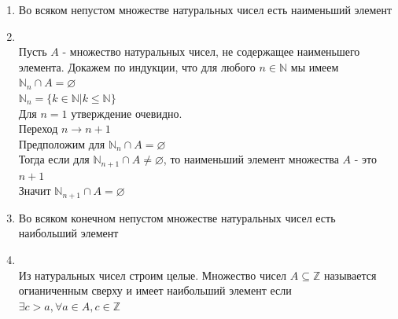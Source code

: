 \documentclass[12pt,letterpaper]{report}
\makeatletter
\theoremstyle{definition}
\newcommand{\Z}{\mathbb{Z}}
\newcommand{\N}{\mathbb{N}}
\renewenvironment{proof}[1][\proofname]{%
   \par\pushQED{\qed}\normalfont%
   \topsep6\p@\@plus6\p@\relax
   \trivlist\item[\hskip\labelsep\bfseries#1\@addpunct{.}]%
   \ignorespaces
}{%
   \popQED\endtrivlist\@endpefalse
}
\makeatother
\begin{document}
\begin{enumerate}
    \item Во всяком непустом множестве натуральных чисел есть наименьший элемент  
    \begin{proof}
        \quad \\
        Пусть $A$ - множество натуральных чисел, не содержащее наименьшего элемента.
        Докажем по индукции, что для любого $n \in \mathbb{N}$ мы имеем $\mathbb{N}_n \cap A = \varnothing$ \\
        $\N_n = \{k \in \N | k \leqslant \N \}$ \\
        Для $n = 1$ утверждение очевидно. \\
        Переход $n \longrightarrow n+1$ \\
        Предположим для $\mathbb{N}_n \cap A = \varnothing$ \\
        Тогда если для $\mathbb{N}_{n+1} \cap A \neq \varnothing$, то наименьший элемент множества $A$ - это $n+1$ \\
        Значит $\mathbb{N}_{n+1} \cap A = \varnothing$
   \end{proof}
   \item Во всяком конечном непустом множестве натуральных чисел есть наибольший элемент
   \begin{proof}
        \quad \\
        Из натуральных чисел строим целые. Множество чисел $A \subseteq \Z$ называется огианиченным сверху и имеет наибольший элемент
        если $\exists c > a, \forall a \in A, c \in \Z$
    \end{proof}
\end{enumerate}
\end{document}
